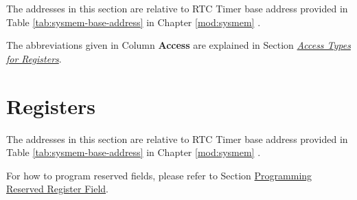 \documentclass[main\_\_EN.tex]{subfiles}
\begin{document}
The addresses in this section are relative to RTC Timer base address provided in Table \ref{tab:sysmem-base-address} in Chapter \ref{mod:sysmem} \textit{}.

The abbreviations given in Column \textbf{Access} are explained in Section \hyperref[glossary-access-types]{\textit{Access Types for Registers}}.






\newpage
\section{Registers}

The addresses in this section are relative to RTC Timer base address provided in Table \ref{tab:sysmem-base-address} in Chapter \ref{mod:sysmem} \textit{}.

For how to program reserved fields, please refer to Section \hyperref[programming-reserved-field]{Programming Reserved Register Field}.


\end{document}
